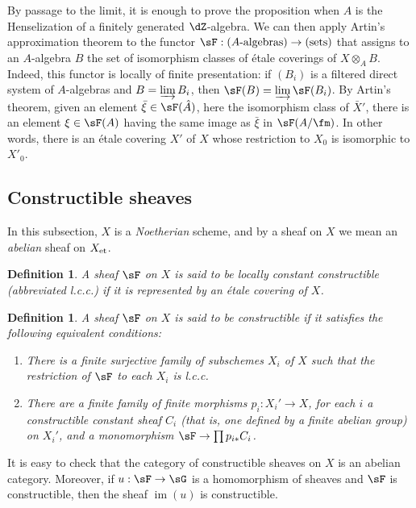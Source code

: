 \documentclass[12pt,oneside,english]{smfbook}
\DeclareMathOperator{\im}{im}
\newcommand{\et}[1]{{#1}_{\textnormal{et}}}
\newtheorem{definition}[subsubsection]{Definition}
\begin{document}
By passage to the limit, it is enough to prove the proposition when $A$ is the Henselization of a finitely generated $\dZ$-algebra. We can then apply Artin's approximation theorem to the functor $\sF:(\textnormal{$A$-algebras})\to(\textnormal{sets})$ that assigns to an $A$-algebra $B$ the set of isomorphism classes of étale coverings of $X\otimes_AB$. Indeed, this functor is locally of finite presentation: if $(B_i)$ is a filtered direct system of $A$-algebras and $B=\varinjlim B_i$, then $\sF(B)=\varinjlim\sF(B_i)$. By Artin's theorem, given an element $\bar\xi\in\sF(\hat A)$, here the isomorphism class of $\bar X'$, there is an element $\xi\in\sF(A)$ having the same image as $\bar\xi$ in $\sF(A/\fm)$. In other words, there is an étale covering $X'$ of $X$ whose restriction to $X_0$ is isomorphic to $X'_0$.

\subsection{Constructible sheaves}\label{I:4-3}

In this subsection, $X$ is a \emph{Noetherian} scheme, and by a sheaf on $X$ we mean an \emph{abelian} sheaf on $\et X$.

\begin{definition}\label{I:4-3-1}
A sheaf $\sF$ on $X$ is said to be \emph{locally constant constructible} (abbreviated l.c.c.) if it is represented by an étale covering of $X$.
\end{definition}

\begin{definition}\label{I:4-3-2}
A sheaf $\sF$ on $X$ is said to be \emph{constructible} if it satisfies the following equivalent conditions:
\begin{enumerate}[\indent (i)]
  \item There is a finite surjective family of subschemes $X_i$ of $X$ such that the restriction of $\sF$ to each $X_i$ is l.c.c.
  \item There are a finite family of finite morphisms $p_i:X_i'\to X$, for each $i$ a constructible constant sheaf $C_i$ (that is, one defined by a finite abelian group) on $X_i'$, and a monomorphism $\sF\to\prod p_{i*}C_i$.
\end{enumerate}
\end{definition}

It is easy to check that the category of constructible sheaves on $X$ is an abelian category. Moreover, if $u:\sF\to\sG$ is a homomorphism of sheaves and $\sF$ is constructible, then the sheaf $\im(u)$ is constructible.
\end{document}
